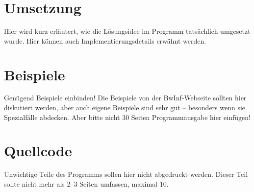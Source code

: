 \documentclass[a4paper,10pt,ngerman]{scrartcl}
\begin{document}
\section{Umsetzung}
Hier wird kurz erläutert, wie die Lösungsidee im Programm tatsächlich umgesetzt
wurde. Hier können auch Implementierungsdetails erwähnt werden.

\section{Beispiele}
Genügend Beispiele einbinden! Die Beispiele von der BwInf-Webseite sollten hier
diskutiert werden, aber auch eigene Beispiele sind sehr gut – besonders wenn
sie Spezialfälle abdecken. Aber bitte nicht 30 Seiten Programmausgabe hier
einfügen!

\section{Quellcode}
Unwichtige Teile des Programms sollen hier nicht abgedruckt werden. Dieser Teil
sollte nicht mehr als 2–3 Seiten umfassen, maximal 10.
\end{document}
